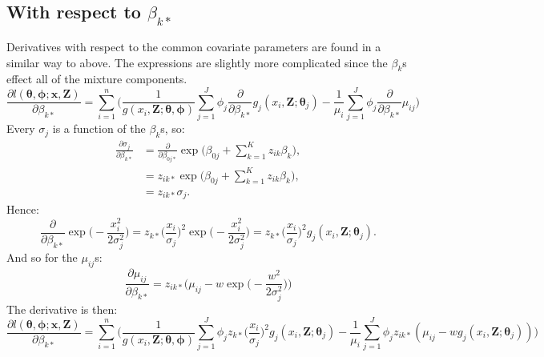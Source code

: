 \documentclass[useAMS,referee, usegraphicx]{biom}
\begin{document}
\subsection*{With respect to $\beta_{k*}$}

Derivatives with respect to the common covariate parameters are found in a similar way to above. The expressions are slightly more complicated since the $\beta_k$s effect all of the mixture components.
\begin{equation*}
\frac{\partial l(\bm{\theta},\bm{\phi}; \mathbf{x},\mathbf{Z})}{\partial \beta_{k*}} = \sum_{i=1}^n \Big( \frac{1}{g(x_i,\mathbf{Z}; \bm{\theta},\bm{\phi})} \sum_{j=1}^J \phi_j \frac{\partial}{\partial \beta_{k*}} g_j(x_i,\mathbf{Z}; \bm{\theta}_j) - \frac{1}{\mu_i} \sum_{j=1}^J \phi_j \frac{\partial}{\partial \beta_{k*}}\mu_{ij}\Big)
\end{equation*}
Every $\sigma_{j}$ is a function of the $\beta_{k}$s, so:
\begin{align*}
\frac{\partial \sigma_{j}}{\partial \beta_{k*}} &= \frac{\partial}{\partial \beta_{0j*}} \exp \Big( \beta_{0j} + \sum_{k=1}^K z_{ik} \beta_{k}\Big),\\
&= z_{ik*} \exp \Big( \beta_{0j} + \sum_{k=1}^K z_{ik} \beta_{k}\Big),\\
&= z_{ik*}\sigma_{j}.
\end{align*}
Hence:
\begin{equation*}
 \frac{\partial}{\partial \beta_{k*}} \exp\Big( -\frac{x_i^2}{2\sigma_{j}^2} \Big) = z_{k*} \Big( \frac{x_i}{\sigma_{j}}\Big)^2 \exp \Big(-\frac{x_i^2}{2 \sigma_{j}^2}\Big) = z_{k*} \Big( \frac{x_i}{\sigma_{j}}\Big)^2 g_j(x_i,\mathbf{Z}; \bm{\theta}_j).
 \label{detfct-deriv-k}
\end{equation*}
And so for the $\mu_{ij}$s:
\begin{equation*}
\frac{\partial \mu_{ij}}{\partial \beta_{k*}} = z_{ik*} \Big( \mu_{ij} - w \exp\Big( -\frac{w^2}{2\sigma_{j}^2} \Big) \Big)
\end{equation*}
The derivative is then:
\begin{equation*}
\frac{\partial l(\bm{\theta},\bm{\phi}; \mathbf{x},\mathbf{Z})}{\partial \beta_{k*}} = \sum_{i=1}^n \Big( \frac{1}{g(x_i,\mathbf{Z}; \bm{\theta},\bm{\phi})} \sum_{j=1}^J \phi_j  z_{k*} \Big( \frac{x_i}{\sigma_{j}}\Big)^2 g_j(x_i,\mathbf{Z}; \bm{\theta}_j) - \frac{1}{\mu_i} \sum_{j=1}^J \phi_j z_{ik*} ( \mu_{ij} - w g_j(x_i,\mathbf{Z}; \bm{\theta}_j) )\Big)
\end{equation*}
\end{document}
